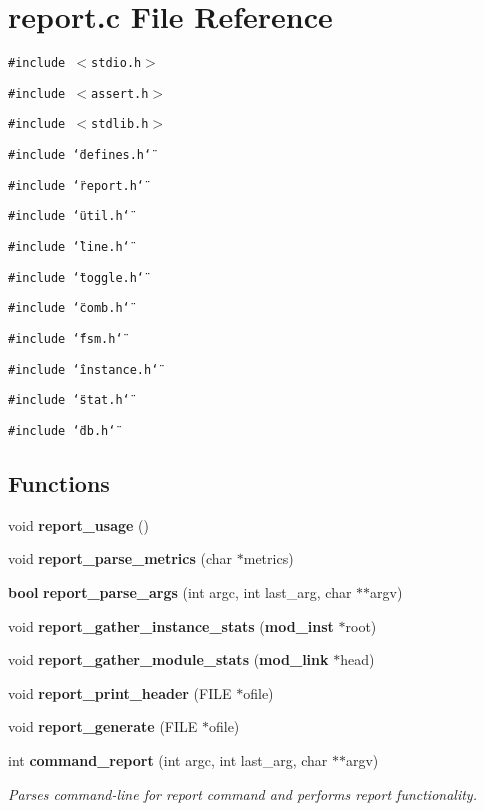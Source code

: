 \section{report.c File Reference}
\label{report_8c}
{\tt \#include $<$stdio.h$>$}\par
{\tt \#include $<$assert.h$>$}\par
{\tt \#include $<$stdlib.h$>$}\par
{\tt \#include \char`\"{}defines.h\char`\"{}}\par
{\tt \#include \char`\"{}report.h\char`\"{}}\par
{\tt \#include \char`\"{}util.h\char`\"{}}\par
{\tt \#include \char`\"{}line.h\char`\"{}}\par
{\tt \#include \char`\"{}toggle.h\char`\"{}}\par
{\tt \#include \char`\"{}comb.h\char`\"{}}\par
{\tt \#include \char`\"{}fsm.h\char`\"{}}\par
{\tt \#include \char`\"{}instance.h\char`\"{}}\par
{\tt \#include \char`\"{}stat.h\char`\"{}}\par
{\tt \#include \char`\"{}db.h\char`\"{}}\par
\subsection*{Functions}
\begin{CompactItemize}
\item 
void {\bf report\_\-usage} ()
\item 
void {\bf report\_\-parse\_\-metrics} (char $\ast$metrics)
\item 
{\bf bool} {\bf report\_\-parse\_\-args} (int argc, int last\_\-arg, char $\ast$$\ast$argv)
\item 
void {\bf report\_\-gather\_\-instance\_\-stats} ({\bf mod\_\-inst} $\ast$root)
\item 
void {\bf report\_\-gather\_\-module\_\-stats} ({\bf mod\_\-link} $\ast$head)
\item 
void {\bf report\_\-print\_\-header} (FILE $\ast$ofile)
\item 
void {\bf report\_\-generate} (FILE $\ast$ofile)
\item 
int {\bf command\_\-report} (int argc, int last\_\-arg, char $\ast$$\ast$argv)
\begin{CompactList}\small\item\em Parses command-line for report command and performs report functionality. \item\end{CompactList}\end{CompactItemize}
